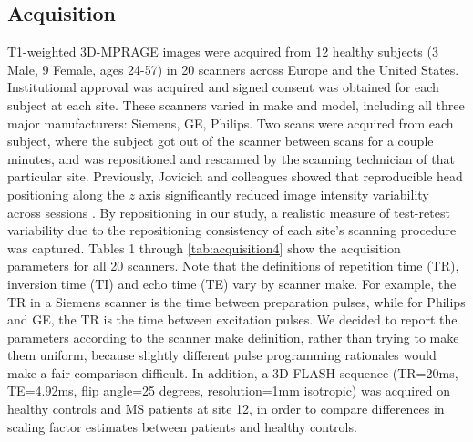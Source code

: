 \subsection{Acquisition}
T1-weighted 3D-MPRAGE images were acquired from 12 healthy subjects (3 Male, 9 Female, ages 24-57) in 20 scanners across Europe and the United States. Institutional approval was acquired and signed consent was obtained for each subject at each site. These scanners varied in make and model, including all three major manufacturers: Siemens, GE, Philips. Two scans were acquired from each subject, where the subject got out of the scanner between scans for a couple minutes, and was repositioned and rescanned by the scanning technician of that particular site. Previously, Jovicich and colleagues showed that reproducible head positioning along the $z$ axis significantly reduced image intensity variability across sessions \cite{freesurferReliability}. By repositioning in our study, a realistic measure of test-retest variability due to the repositioning consistency of each site's scanning procedure was captured. Tables 1 through \ref{tab:acquisition4} show the acquisition parameters for all 20 scanners. Note that the definitions of repetition time (TR), inversion time (TI) and echo time (TE) vary by scanner make. For example, the TR in a Siemens scanner is the time between preparation pulses, while for Philips and GE, the TR is the time between excitation pulses. We decided to report the parameters according to the scanner make definition, rather than trying to make them uniform, because slightly different pulse programming rationales would make a fair comparison difficult. In addition, a 3D-FLASH sequence (TR=20ms, TE=4.92ms, flip angle=25 degrees, resolution=1mm isotropic) was acquired on healthy controls and MS patients at site 12, in order to compare differences in scaling factor estimates between patients and healthy controls. 